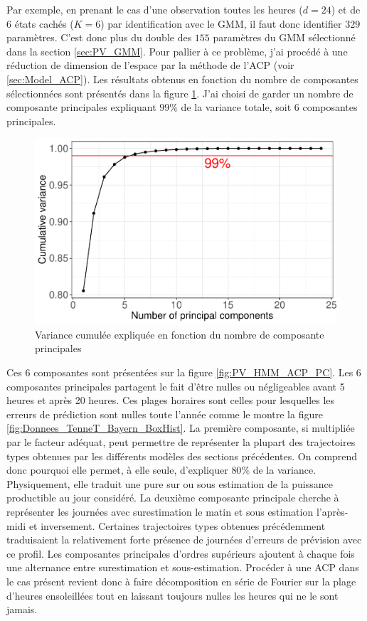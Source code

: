 \documentclass[12pt]{report}
\begin{document}
Par exemple, en prenant le cas d'une observation toutes les heures ($d=24$) et de 6 états cachés ($K=6$) par identification avec le GMM, il faut donc identifier $329$ paramètres. C'est donc plus du double des $155$ paramètres du GMM sélectionné dans la section \ref{sec:PV_GMM}. Pour pallier à ce problème, j'ai procédé à une réduction de dimension de l'espace par la méthode de l'ACP (voir \ref{sec:Model_ACP}). Les résultats obtenus en fonction du nombre de composantes sélectionnées sont présentés dans la figure \ref{fig:PV_HMM_ACP_DimSelect}. J'ai choisi de garder un nombre de composante principales expliquant $99 \%$ de la variance totale, soit 6 composantes principales. 

\begin{figure}[h]
	\centering
	\includegraphics[width = 0.8 \linewidth]{Images/PV/ACP/ACP_DimSelect.pdf}
	\caption{Variance cumulée expliquée en fonction du nombre de composante principales}
	\label{fig:PV_HMM_ACP_DimSelect}
\end{figure}

Ces 6 composantes sont présentées sur la figure \ref{fig:PV_HMM_ACP_PC}. Les 6 composantes principales partagent le fait d'être nulles ou négligeables avant 5 heures et après 20 heures. Ces plages horaires sont celles pour lesquelles les erreurs de prédiction sont nulles toute l'année comme le montre la figure \ref{fig:Donnees_TenneT_Bayern_BoxHist}. La première composante, si multipliée par le facteur adéquat, peut permettre de représenter la plupart des trajectoires types obtenues par les différents modèles des sections précédentes. On comprend donc pourquoi elle permet, à elle seule, d'expliquer $80\%$ de la variance. Physiquement, elle traduit une pure sur ou sous estimation de la puissance productible au jour considéré. La deuxième composante principale cherche à représenter les journées avec surestimation le matin et sous estimation l'après-midi et inversement. Certaines trajectoires types obtenues précédemment traduisaient la relativement forte présence de journées d'erreurs de prévision avec ce profil. Les composantes principales d'ordres supérieurs ajoutent à chaque fois une alternance entre surestimation et sous-estimation. Procéder à une ACP dans le cas présent revient donc à faire décomposition en série de Fourier sur la plage d'heures ensoleillées tout en laissant toujours nulles les heures qui ne le sont jamais.
\end{document}
